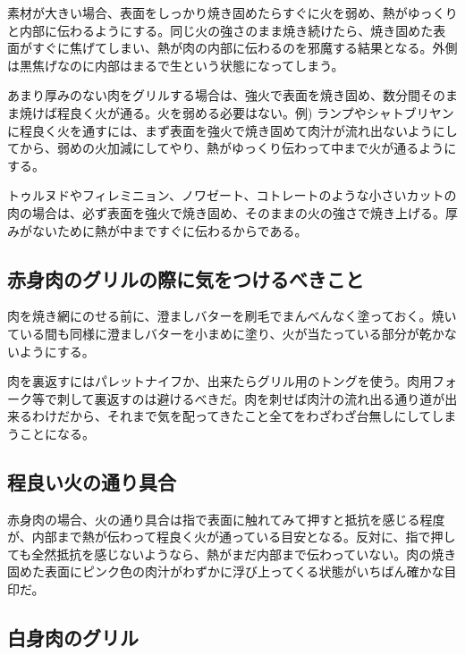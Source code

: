 素材が大きい場合、表面をしっかり焼き固めたらすぐに火を弱め、熱がゆっくりと内部に伝わるようにする。同じ火の強さのまま焼き続けたら、焼き固めた表面がすぐに焦げてしまい、熱が肉の内部に伝わるのを邪魔する結果となる。外側は黒焦げなのに内部はまるで生という状態になってしまう。

あまり厚みのない肉をグリルする場合は、強火で表面を焼き固め、数分間そのまま焼けば程良く火が通る。火を弱める必要はない。例)
ランプやシャトブリヤンに程良く火を通すには、まず表面を強火で焼き固めて肉汁が流れ出ないようにしてから、弱めの火加減にしてやり、熱がゆっくり伝わって中まで火が通るようにする。

トゥルヌドやフィレミニョン、ノワゼート、コトレートのような小さいカットの肉の場合は、必ず表面を強火で焼き固め、そのままの火の強さで焼き上げる。厚みがないために熱が中まですぐに伝わるからである。

\hypertarget{ux8d64ux8eabux8089ux306eux30b0ux30eaux30ebux306eux969bux306bux6c17ux3092ux3064ux3051ux308bux3079ux304dux3053ux3068}{%
\subsection{赤身肉のグリルの際に気をつけるべきこと}\label{ux8d64ux8eabux8089ux306eux30b0ux30eaux30ebux306eux969bux306bux6c17ux3092ux3064ux3051ux308bux3079ux304dux3053ux3068}}

肉を焼き網にのせる前に、澄ましバターを刷毛でまんべんなく塗っておく。焼いている間も同様に澄ましバターを小まめに塗り、火が当たっている部分が乾かないようにする。

肉を裏返すにはパレットナイフか、出来たらグリル用のトングを使う。肉用フォーク等で刺して裏返すのは避けるべきだ。肉を刺せば肉汁の流れ出る通り道が出来るわけだから、それまで気を配ってきたこと全てをわざわざ台無しにしてしまうことになる。

\hypertarget{ux7a0bux826fux3044ux706bux306eux901aux308aux5177ux5408}{%
\subsection{程良い火の通り具合}\label{ux7a0bux826fux3044ux706bux306eux901aux308aux5177ux5408}}

赤身肉の場合、火の通り具合は指で表面に触れてみて押すと抵抗を感じる程度が、内部まで熱が伝わって程良く火が通っている目安となる。反対に、指で押しても全然抵抗を感じないようなら、熱がまだ内部まで伝わっていない。肉の焼き固めた表面にピンク色の肉汁がわずかに浮び上ってくる状態がいちばん確かな目印だ。

\hypertarget{ux767dux8eabux8089ux306eux30b0ux30eaux30eb}{%
\subsection{白身肉のグリル}\label{ux767dux8eabux8089ux306eux30b0ux30eaux30eb}}

